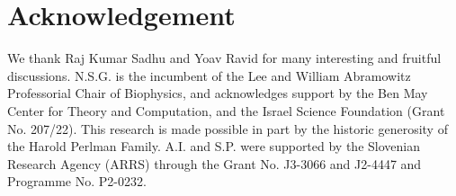 \documentclass[
reprint,
superscriptaddress,
 amsmath,amssymb,
 aps,
prl,
floatfix]{revtex4-2}
\begin{document}
\section*{Acknowledgement}
We thank Raj Kumar Sadhu and Yoav Ravid for many interesting and fruitful discussions. N.S.G. is the incumbent of the Lee and William Abramowitz Professorial Chair of Biophysics, and acknowledges support by the Ben May Center for Theory and Computation, and the Israel Science Foundation (Grant No. 207/22). This research is made possible in part by the historic generosity of the Harold Perlman Family. A.I. and S.P. were supported by the Slovenian Research Agency (ARRS) through the Grant No. J3-3066 and J2-4447 and Programme No. P2-0232.

%
\end{document}
